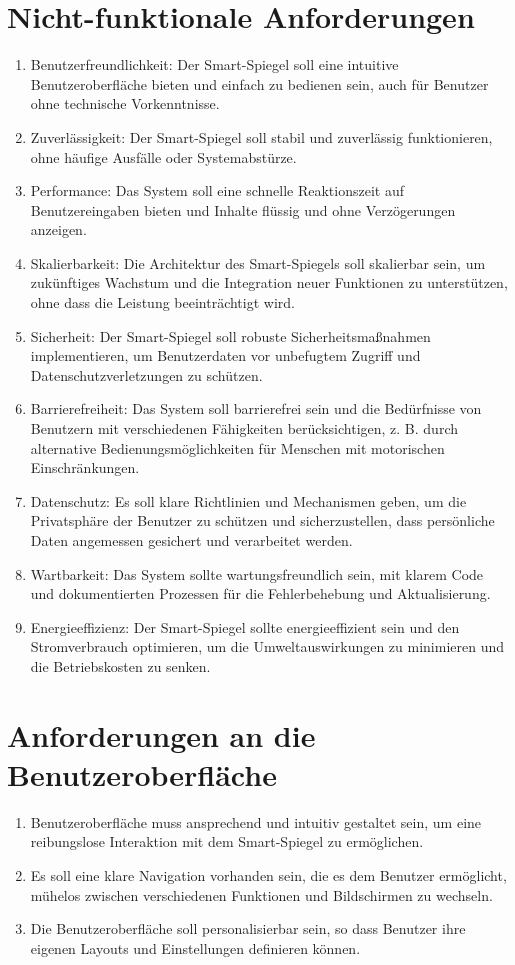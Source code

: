 \documentclass{article}
\begin{document}
\section{Nicht-funktionale Anforderungen}
\begin{enumerate}[label=\textbf{NFA\arabic*:}]
    \item Benutzerfreundlichkeit: Der Smart-Spiegel soll eine intuitive Benutzeroberfläche bieten und einfach zu bedienen sein, auch für Benutzer ohne technische Vorkenntnisse.
    \item Zuverlässigkeit: Der Smart-Spiegel soll stabil und zuverlässig funktionieren, ohne häufige Ausfälle oder Systemabstürze.
    \item Performance: Das System soll eine schnelle Reaktionszeit auf Benutzereingaben bieten und Inhalte flüssig und ohne Verzögerungen anzeigen.
    \item Skalierbarkeit: Die Architektur des Smart-Spiegels soll skalierbar sein, um zukünftiges Wachstum und die Integration neuer Funktionen zu unterstützen, ohne dass die Leistung beeinträchtigt wird.
    \item Sicherheit: Der Smart-Spiegel soll robuste Sicherheitsmaßnahmen implementieren, um Benutzerdaten vor unbefugtem Zugriff und Datenschutzverletzungen zu schützen.
    \item Barrierefreiheit: Das System soll barrierefrei sein und die Bedürfnisse von Benutzern mit verschiedenen Fähigkeiten berücksichtigen, z. B. durch alternative Bedienungsmöglichkeiten für Menschen mit motorischen Einschränkungen.
    \item Datenschutz: Es soll klare Richtlinien und Mechanismen geben, um die Privatsphäre der Benutzer zu schützen und sicherzustellen, dass persönliche Daten angemessen gesichert und verarbeitet werden.
    \item Wartbarkeit: Das System sollte wartungsfreundlich sein, mit klarem Code und dokumentierten Prozessen für die Fehlerbehebung und Aktualisierung.
    \item Energieeffizienz: Der Smart-Spiegel sollte energieeffizient sein und den Stromverbrauch optimieren, um die Umweltauswirkungen zu minimieren und die Betriebskosten zu senken.
\end{enumerate}

\section{Anforderungen an die Benutzeroberfläche}
\begin{enumerate}[label=\textbf{B\arabic*:}]
    \item Benutzeroberfläche muss ansprechend und intuitiv gestaltet sein, um eine reibungslose Interaktion mit dem Smart-Spiegel zu ermöglichen.
    \item Es soll eine klare Navigation vorhanden sein, die es dem Benutzer ermöglicht, mühelos zwischen verschiedenen Funktionen und Bildschirmen zu wechseln.
    \item Die Benutzeroberfläche soll personalisierbar sein, so dass Benutzer ihre eigenen Layouts und Einstellungen definieren können.
\end{enumerate}
\end{document}
